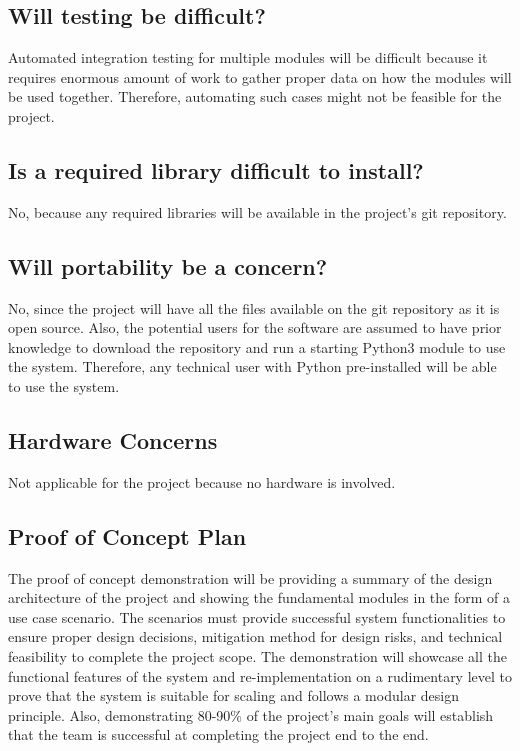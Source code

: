 \documentclass{article}
\begin{document}
\subsection{Will testing be difficult?}
Automated integration testing for multiple modules will be difficult because it requires enormous amount of work to gather proper data on how the modules will be used together. Therefore, automating such cases might not be feasible for the project.

\subsection{Is a required library difficult to install?}
No, because any required libraries will be available in the project's git repository.

\subsection{Will portability be a concern?}
No, since the project will have all the files available on the git repository as it is open source. Also, the potential users for the software are assumed to have prior knowledge to download the repository and run a starting Python3 module to use the system. Therefore, any technical user with Python pre-installed will be able to use the system.

\subsection{Hardware Concerns}
Not applicable for the project because no hardware is involved. 

\subsection{Proof of Concept Plan}
The proof of concept demonstration will be providing a summary of the design architecture of the project and showing the fundamental modules in the form of a use case scenario. The scenarios must provide successful system functionalities to ensure proper design decisions, mitigation method for design risks, and technical feasibility to complete the project scope. The demonstration will showcase all the functional features of the system and re-implementation on a rudimentary level to prove that the system is suitable for scaling and follows a modular design principle. Also, demonstrating 80-90\% of the project's main goals will establish that the team is successful at completing the project end to the end.
\end{document}
